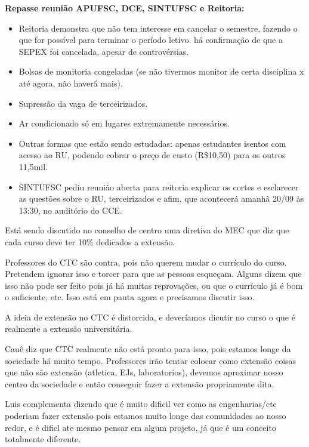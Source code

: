 \documentclass{ata-calico}
\begin{document}
\textbf{Repasse reunião APUFSC, DCE, SINTUFSC e Reitoria:}

\begin{itemize}
\item Reitoria demonstra que não tem interesse em cancelar o semestre, fazendo o que for possível para terminar o período letivo. há confirmação de que a SEPEX foi cancelada, apesar de controvérsias.

\item Bolsas de monitoria congeladas (se não tivermos monitor de certa disciplina x até agora, não haverá mais). 

\item Supressão da vaga de terceirizados. 

\item Ar condicionado só em lugares extremamente necessários.

\item Outras formas que estão sendo estudadas: apenas estudantes isentos com acesso ao RU, podendo cobrar o preço de custo (R\$10,50) para os outros 11,5mil. 

\item SINTUFSC pediu reunião aberta para reitoria explicar os cortes e esclarecer as questões sobre o RU, terceirizados e afim, que acontecerá amanhã 20/09 às 13:30, no auditório do CCE.

\end{itemize}
Está sendo discutido no conselho de centro uma diretiva do MEC que diz que cada curso deve ter 10\% dedicados a extensão.

Professores do CTC são contra, pois não querem mudar o currículo do curso. Pretendem ignorar isso e torcer para que as pessoas esqueçam. Alguns dizem que isso não pode ser feito pois já há muitas reprovações, ou que o currículo já é bom o suficiente, etc. Isso está em pauta agora e precisamos discutir isso. 

A ideia de extensão no CTC é distorcida, e deveríamos dicutir no curso o que é realmente a extensão universitária.

Cauê diz que CTC realmente não está pronto para isso, pois estamos longe da sociedade há muito tempo. Professores irão tentar colocar como extensão coisas que não são extensão (atletica, EJs, laboratorios), devemos aproximar nosso centro da sociedade e então conseguir fazer a extensão propriamente dita.

Luis complementa dizendo que é muito dificil ver como as engenharias/ctc poderiam fazer extensão pois estamos muito longe das comunidades ao nosso redor, e é dificl ate mesmo pensar em algum projeto, já que é um conceito totalmente diferente.\newline
\end{document}
